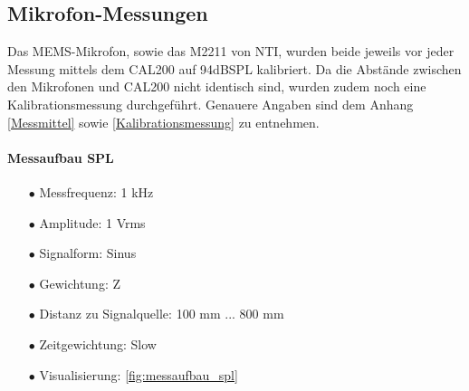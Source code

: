 \documentclass[12pt]{article}
\begin{document}
	\subsection{Mikrofon-Messungen}
	Das MEMS-Mikrofon, sowie das M2211 von NTI, wurden beide jeweils vor jeder Messung mittels dem CAL200 auf 94dBSPL kalibriert. Da die Abstände zwischen den Mikrofonen und CAL200 nicht identisch sind, wurden zudem noch eine Kalibrationsmessung durchgeführt. Genauere Angaben sind dem Anhang \ref{Messmittel} sowie \ref{Kalibrationsmessung} zu entnehmen.
	\paragraph{Messaufbau SPL}
		\begin{itemize}[topsep=10pt,partopsep=0pt,labelwidth=5cm,align=left,itemindent=5cm]
		\item[$\bullet$ Messfrequenz:] 1 kHz
		\item[$\bullet$ Amplitude:]  1 Vrms
		\item[$\bullet$ Signalform:]  Sinus
		\item[$\bullet$ Gewichtung:]  Z
		\item[$\bullet$ Distanz zu Signalquelle:]  100 mm ... 800 mm
		\item[$\bullet$ Zeitgewichtung:]  Slow
		\item[$\bullet$ Visualisierung:]  \ref{fig:messaufbau_spl}
	\end{itemize}
\end{document}
